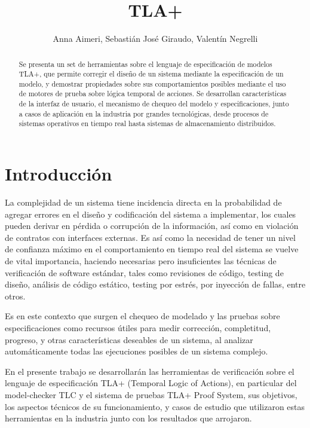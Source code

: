 \documentclass[runningheads]{llncs}
\begin{document}
\title{TLA+}
\author{Anna Aimeri, Sebastián José Giraudo, Valentín Negrelli}
\maketitle             

\begin{abstract}
Se presenta un set de herramientas sobre el lenguaje de especificación de modelos TLA+, que permite corregir el diseño de un sistema mediante la especificación de un modelo, y demostrar propiedades sobre sus comportamientos posibles mediante el uso de motores de prueba sobre lógica temporal de acciones. Se desarrollan características de la interfaz de usuario, el mecanismo de chequeo del modelo y especificaciones, junto a casos de aplicación en la industria por grandes tecnológicas, desde procesos de sistemas operativos en tiempo real hasta sistemas de almacenamiento distribuidos.
\end{abstract}

\section{Introducción}
La complejidad de un sistema tiene incidencia directa en la probabilidad de agregar errores en el diseño y codificación del sistema a implementar, los cuales pueden derivar en pérdida o corrupción de la información, así como en violación de contratos con interfaces externas. Es así como la necesidad de tener un nivel de confianza máximo en el comportamiento en tiempo real del sistema se vuelve de vital importancia, haciendo necesarias pero insuficientes las técnicas de verificación de software estándar, tales como revisiones de código, testing de diseño, análisis de código estático, testing por estrés, por inyección de fallas, entre otros. 

Es en este contexto que surgen el chequeo de modelado y las pruebas sobre especificaciones como recursos útiles para medir corrección, completitud, progreso, y otras características deseables de un sistema, al analizar automáticamente todas las ejecuciones posibles de un sistema complejo.

En el presente trabajo se desarrollarán las herramientas de verificación sobre el lenguaje de especificación TLA+ (Temporal Logic of Actions), en particular del model-checker TLC y el sistema de pruebas TLA+ Proof System, sus objetivos, los aspectos técnicos de su funcionamiento, y casos de estudio que utilizaron estas herramientas en la industria junto con los resultados que arrojaron.
\end{document}
